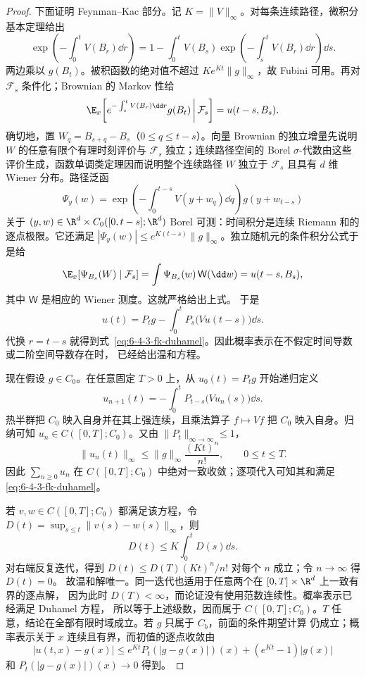 \begin{proof}
下面证明 Feynman--Kac 部分。记 $K=\|V\|_\infty$。对每条连续路径，微积分基本定理给出
\begin{equation}\label{eq:6-4-3-path-exponential-identity}
 \exp\!\left(-\int_0^tV(B_r)\dd r\right)
 =1-\int_0^tV(B_s)
 \exp\!\left(-\int_s^tV(B_r)\dd r\right)\dd s.
\end{equation}
两边乘以 $g(B_t)$。被积函数的绝对值不超过
$K e^{Kt}\|g\|_\infty$，故 Fubini 可用。再对 $\mathcal F_s$ 条件化；Brownian 的 Markov 性给
\[
 \E_x\!\left[
 e^{-\int_s^tV(B_r)\dd r}g(B_t)\,\middle|\,\mathcal F_s
 \right]
 =u(t-s,B_s).
\]
确切地，置 $W_q=B_{s+q}-B_s$（$0\le q\le t-s$）。向量 Brownian 的独立增量先说明
$W$ 的任意有限个有理时刻评价与 $\mathcal F_s$ 独立；连续路径空间的 Borel
$\sigma$-代数由这些评价生成，函数单调类定理因而说明整个连续路径 $W$ 独立于
$\mathcal F_s$ 且具有 $d$ 维 Wiener 分布。路径泛函
\[
 \Psi_y(w)=
 \exp\!\left(-\int_0^{t-s}V(y+w_q)\dd q\right)g(y+w_{t-s})
\]
关于 $(y,w)\in\R^d\times C_0([0,t-s];\R^d)$ Borel 可测：时间积分是连续
Riemann 和的逐点极限。它还满足
$|\Psi_y(w)|\le e^{K(t-s)}\|g\|_\infty$。独立随机元的条件积分公式于是给
\[
 \E_x[\Psi_{B_s}(W)\mid\mathcal F_s]
 =\int\Psi_{B_s}(w)\,\mathsf W(\dd w)
 =u(t-s,B_s),
\]
其中 $\mathsf W$ 是相应的 Wiener 测度。这就严格给出上式。
于是
\[
 u(t)=P_tg-\int_0^tP_s\bigl(Vu(t-s)\bigr)\dd s.
\]
代换 $r=t-s$ 就得到式~\eqref{eq:6-4-3-fk-duhamel}。因此概率表示在不假定时间导数或二阶空间导数存在时，
已经给出温和方程。

现在假设 $g\in C_0$。在任意固定 $T>0$ 上，从 $u_0(t)=P_tg$ 开始递归定义
\[
 u_{n+1}(t)=-\int_0^tP_{t-s}\bigl(Vu_n(s)\bigr)\dd s.
\]
热半群把 $C_0$ 映入自身并在其上强连续，且乘法算子
$f\mapsto Vf$ 把 $C_0$ 映入自身。归纳可知
$u_n\in C([0,T];C_0)$。又由 $\|P_t\|_{\infty\to\infty}\le1$，
\begin{equation}\label{eq:6-4-3-dyson-bound}
 \|u_n(t)\|_\infty
 \le\|g\|_\infty\frac{(Kt)^n}{n!},
 \qquad 0\le t\le T.
\end{equation}
因此 $\sum_{n\ge0}u_n$ 在 $C([0,T];C_0)$ 中绝对一致收敛；逐项代入可知其和满足
\eqref{eq:6-4-3-fk-duhamel}。

若 $v,w\in C([0,T];C_0)$ 都满足该方程，令
$D(t)=\sup_{s\le t}\|v(s)-w(s)\|_\infty$，则
\[
 D(t)\le K\int_0^tD(s)\dd s.
\]
对右端反复迭代，得到
$D(t)\le D(T)(Kt)^n/n!$ 对每个 $n$ 成立；令 $n\to\infty$ 得 $D(t)=0$。
故温和解唯一。同一迭代也适用于任意两个在 $[0,T]\times\R^d$ 上一致有界的逐点解，
因为此时 $D(T)<\infty$，而论证没有使用范数连续性。概率表示已经满足 Duhamel 方程，
所以等于上述级数，因而属于
$C([0,T];C_0)$。$T$ 任意，结论在全部有限时域成立。若 $g$ 只属于 $C_b$，前面的条件期望计算
仍成立；概率表示关于 $x$ 连续且有界，而初值的逐点收敛由
\[
 |u(t,x)-g(x)|
 \le e^{Kt}P_t\!\left(|g-g(x)|\right)(x)
    +(e^{Kt}-1)|g(x)|
\]
和 $P_t(|g-g(x)|)(x)\to0$ 得到。


\end{proof}
